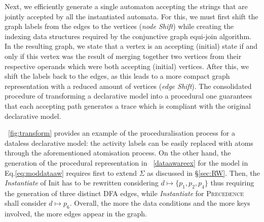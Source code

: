 \documentclass[acmengage]{acmart}
\begin{document}
Next, %
we %
efficiently generate a single automaton accepting the strings that are jointly accepted by all the instantiated automata. For this, we must first shift the graph labels from the edges to the vertices (\textit{node Shift}) while creating the indexing data structures required by the conjunctive graph equi-join algorithm. %
In the resulting graph, we state that a vertex is an accepting (initial) state if and only if this vertex was the result of merging together two vertices from their respective operands which were both accepting (initial) vertices. After this, we shift the labels back to the edges, as this leads to a more compact graph representation with a reduced amount of vertices (\textit{edge Shift}). The consolidated procedure of transforming a declarative model into a procedural one guarantees that each accepting path generates a trace which is compliant with the original declarative model.

%



\figurename~\ref{fig:transform} provides an example of the proceduralisation process for a dataless declarative model: the activity labels can be easily replaced with atoms through the aforementioned atomisation process. On the other hand, the generation of the procedural representation in \figurename~\ref{dataawareex} for the model in Eq.\ref{eq:moddataaw} requires first to extend $\Sigma$ as discussed in \S\ref{sec:RW}. Then, the \textit{Instantiate} of \textsf{Init} has to be rewritten considering $d\mapsto \{p_1,p_2,p_4\}$ thus requiring the generation of three distinct DFA edges, while \textit{Instantiate} for \textsc{Precedence} shall consider $d\mapsto p_6$. Overall, the more the data conditions and the more keys involved, the more edges appear in the graph.
\end{document}
